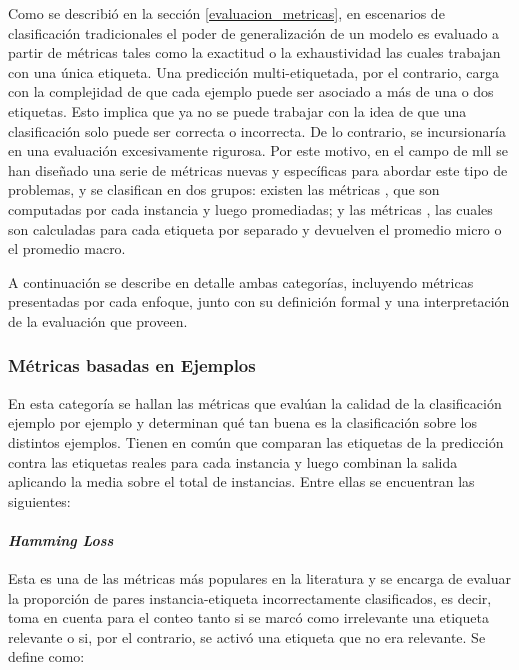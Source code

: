 Como se describió en la sección \ref{evaluacion_metricas}, en escenarios de
clasificación tradicionales el poder de generalización de un modelo es evaluado
a partir de métricas tales como la exactitud o la exhaustividad las cuales
trabajan con una única etiqueta. Una predicción multi-etiquetada, por el
contrario, carga con la complejidad de que cada ejemplo puede ser asociado a más
de una o dos etiquetas. Esto implica que ya no se puede trabajar con la idea de
que una clasificación solo puede ser correcta o incorrecta. De lo contrario, se
incursionaría en una evaluación excesivamente rigurosa. Por este motivo, en el
campo de \acrshort{mll} se han diseñado una serie de métricas nuevas y
específicas para abordar este tipo de problemas, y se clasifican en dos grupos:
existen las métricas , que son computadas por cada
instancia y luego promediadas; y las métricas ,
las cuales son calculadas para cada etiqueta por separado y devuelven el
promedio micro o el promedio macro. 

A continuación se describe en detalle ambas categorías, incluyendo métricas
presentadas por cada enfoque, junto con su definición formal y una
interpretación de la evaluación que proveen.

\subsubsection{Métricas basadas en Ejemplos}

En esta categoría se hallan las métricas que evalúan la calidad de la
clasificación ejemplo por ejemplo y determinan qué tan buena es la clasificación
sobre los distintos ejemplos. Tienen en común que comparan las etiquetas de la
predicción contra las etiquetas reales para cada instancia y luego combinan la
salida aplicando la media sobre el total de instancias. Entre ellas se
encuentran las siguientes:

\paragraph{\textit{Hamming Loss}}

Esta es una de las métricas más populares en la literatura y se encarga de
evaluar la proporción de pares instancia-etiqueta incorrectamente clasificados,
es decir, toma en cuenta para el conteo tanto si se marcó como irrelevante una
etiqueta relevante o si, por el contrario, se activó una etiqueta que no era
relevante. Se define como: 

